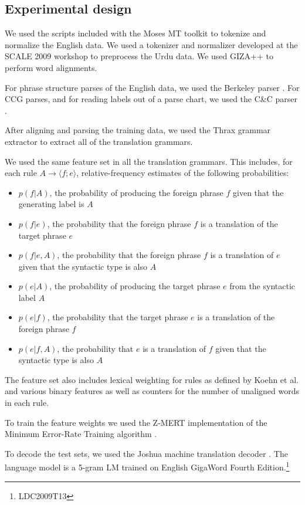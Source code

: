 \documentclass[a4paper]{article}
\begin{document}
\subsection{Experimental design}

We used the scripts included with the Moses MT toolkit \cite{moses} to tokenize and normalize the English data. We used a tokenizer and normalizer developed at the SCALE 2009 workshop \cite{scale09} to preprocess the Urdu data. We used GIZA++ \cite{giza} to perform word alignments.

For phrase structure parses of the English data, we used the Berkeley parser \cite{Petrov-Klein-Inference}. For CCG parses, and for reading labels out of a parse chart, we used the C\&C parser \cite{candc}.

After aligning and parsing the training data, we used the Thrax grammar extractor \cite{joshua3} to extract all of the translation grammars.

We used the same feature set in all the translation grammars. This includes, for each rule $A \to \langle f ; e \rangle$, relative-frequency estimates of the following probabilities:
\begin{itemize}
\item $p(f|A)$, the probability of producing the foreign phrase $f$ given that the generating label is $A$
\item $p(f|e)$, the probability that the foreign phrase $f$ is a translation of the target phrase $e$
\item $p(f|e,A)$, the probability that the foreign phrase $f$ is a translation of $e$ given that the syntactic type is also $A$
\item $p(e|A)$, the probability of producing the target phrase $e$ from the syntactic label $A$
\item $p(e|f)$, the probability that the target phrase $e$ is a translation of the foreign phrase $f$
\item $p(e|f,A)$, the probability that $e$ is a translation of $f$ given that the syntactic type is also $A$
\end{itemize}
The feature set also includes lexical weighting for rules as defined by Koehn et al.  and various binary features as well as counters for the number of unaligned words in each rule.

To train the feature weights we used the Z-MERT implementation \cite{zmert} of the Minimum Error-Rate Training algorithm \cite{mert}.

To decode the test sets, we used the Joshua machine translation decoder \cite{joshua3}. The language model is a 5-gram LM trained on English GigaWord Fourth Edition.\footnote{LDC2009T13}
\end{document}
